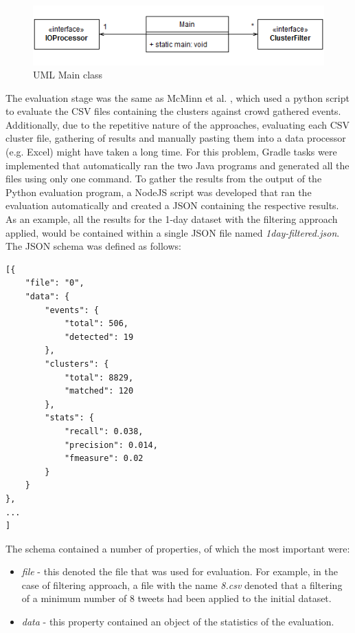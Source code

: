 \documentclass[a4paper,portrait,12pt]{article}
\begin{document}
\begin{figure}[h!]
	\centering
	\includegraphics[width=0.7\linewidth]{images/mainUML.png}
	\caption{UML Main class}
	\label{fig:mainUML}
\end{figure}

The evaluation stage was the same as McMinn et al. \cite{McMinn2013}, which used a python script to evaluate the CSV files containing the clusters against crowd gathered events.
Additionally, due to the repetitive nature of the approaches, evaluating each CSV cluster file, gathering of results and manually pasting them into a data processor (e.g. Excel) might have taken a long time.
For this problem, Gradle tasks were implemented that automatically ran the two Java programs and generated all the files using only one command.
To gather the results from the output of the Python evaluation program, a NodeJS script was developed that ran the evaluation automatically and created a JSON containing the respective results.
As an example, all the results for the 1-day dataset with the filtering approach applied, would be contained within a single JSON file named \textit{1day-filtered.json}.
The JSON schema was defined as follows:

\begin{lstlisting}[caption=JSON Schema Example, label=json-schema]
[{
    "file": "0",
    "data": {
        "events": {
            "total": 506,
            "detected": 19
        },
        "clusters": {
            "total": 8829,
            "matched": 120
        },
        "stats": {
            "recall": 0.038,
            "precision": 0.014,
            "fmeasure": 0.02
        }
    }
},
...
]
\end{lstlisting}

The schema contained a number of properties, of which the most important were:
\begin{itemize}
	\item \textit{file} - this denoted the file that was used for evaluation.
	      For example, in the case of filtering approach, a file with the name \textit{8.csv} denoted that a filtering of a minimum number of 8 tweets had been applied to the initial dataset.
	\item \textit{data} - this property contained an object of the statistics of the evaluation.
\end{itemize}
\end{document}
